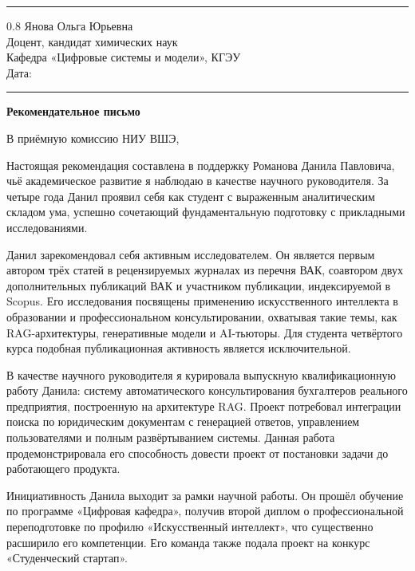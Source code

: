 \documentclass[a4paper,12pt]{article}
\begin{document}
\vspace{4pt}
\noindent\rule{\textwidth}{0.8pt}

\begin{flushright}
  \begin{spacing}{0.8}
    Янова Ольга Юрьевна\\
    Доцент, кандидат химических наук\\
    Кафедра «Цифровые системы и модели», КГЭУ\\[6pt]
    Дата: \rule{4cm}{0.4pt}
  \end{spacing}
\end{flushright}

\begin{center}
  {\Large\bfseries Рекомендательное письмо}
\end{center}

В приёмную комиссию НИУ ВШЭ,

Настоящая рекомендация составлена в поддержку Романова Данила Павловича, чьё академическое развитие я наблюдаю в качестве научного руководителя. За четыре года Данил проявил себя как студент с выраженным аналитическим складом ума, успешно сочетающий фундаментальную подготовку с прикладными исследованиями.

Данил зарекомендовал себя активным исследователем. Он является первым автором трёх статей в рецензируемых журналах из перечня ВАК, соавтором двух дополнительных публикаций ВАК и участником публикации, индексируемой в Scopus. Его исследования посвящены применению искусственного интеллекта в образовании и профессиональном консультировании, охватывая такие темы, как RAG-архитектуры, генеративные модели и AI-тьюторы. Для студента четвёртого курса подобная публикационная активность является исключительной.

В качестве научного руководителя я курировала выпускную квалификационную работу Данила: систему автоматического консультирования бухгалтеров реального предприятия, построенную на архитектуре RAG. Проект потребовал интеграции поиска по юридическим документам с генерацией ответов, управлением пользователями и полным развёртыванием системы. Данная работа продемонстрировала его способность довести проект от постановки задачи до работающего продукта.

Инициативность Данила выходит за рамки научной работы. Он прошёл обучение по программе «Цифровая кафедра», получив второй диплом о профессиональной переподготовке по профилю «Искусственный интеллект», что существенно расширило его компетенции. Его команда также подала проект на конкурс «Студенческий стартап».
\end{document}
